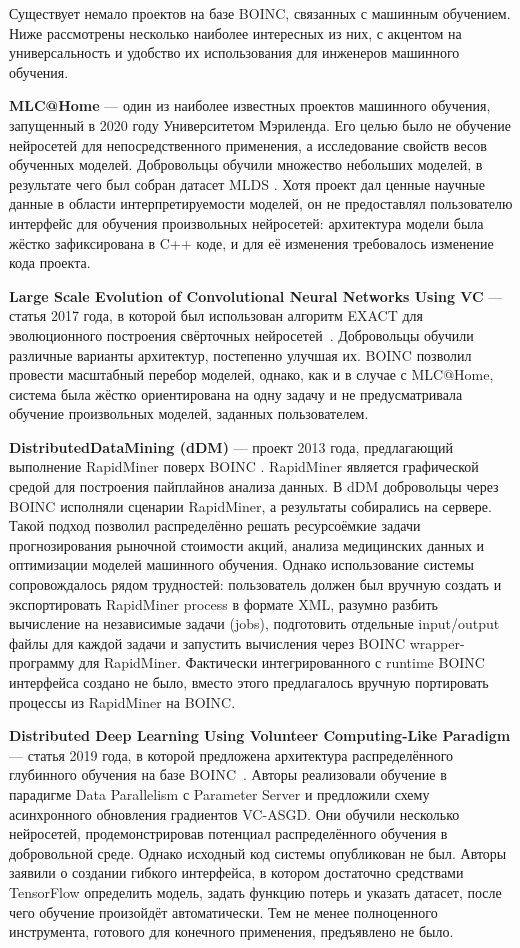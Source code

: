 \documentclass[a4paper,12pt]{extarticle}
\begin{document}
Существует немало проектов на базе BOINC, связанных с машинным обучением. Ниже рассмотрены несколько наиболее интересных из них, с акцентом на универсальность и удобство их использования для инженеров машинного обучения.

\textbf{MLC@Home} — один из наиболее известных проектов машинного обучения, запущенный в 2020 году Университетом Мэриленда. Его целью было не обучение нейросетей для непосредственного применения, а исследование свойств весов обученных моделей. Добровольцы обучили множество небольших моделей, в результате чего был собран датасет MLDS \cite{Clemens2021}. Хотя проект дал ценные научные данные в области интерпретируемости моделей, он не предоставлял пользователю интерфейс для обучения произвольных нейросетей: архитектура модели была жёстко зафиксирована в C++ коде, и для её изменения требовалось изменение кода проекта.

\textbf{Large Scale Evolution of Convolutional Neural Networks Using VC} — статья 2017 года, в которой был использован алгоритм EXACT для эволюционного построения свёрточных нейросетей~\cite{Desell2017}. Добровольцы обучили различные варианты архитектур, постепенно улучшая их. BOINC позволил провести масштабный перебор моделей, однако, как и в случае с MLC@Home, система была жёстко ориентирована на одну задачу и не предусматривала обучение произвольных моделей, заданных пользователем.

\textbf{DistributedDataMining (dDM)} — проект 2013 года, предлагающий выполнение RapidMiner поверх BOINC \cite{Schlitter2013}. RapidMiner является графической средой для построения пайплайнов анализа данных. В dDM добровольцы через BOINC исполняли сценарии \newline RapidMiner, а результаты собирались на сервере. Такой подход позволил распределённо решать ресурсоёмкие задачи прогнозирования рыночной стоимости акций, анализа медицинских данных и оптимизации моделей машинного обучения. Однако использование системы сопровождалось рядом трудностей: пользователь должен был вручную создать и экспортировать RapidMiner process в формате XML, разумно разбить вычисление на независимые задачи (jobs), подготовить отдельные input/output файлы для каждой задачи и запустить вычисления через BOINC wrapper-программу для RapidMiner. Фактически интегрированного с runtime BOINC интерфейса создано не было, вместо этого предлагалось вручную портировать процессы из RapidMiner на BOINC.

\textbf{Distributed Deep Learning Using Volunteer Computing-Like Paradigm} — статья 2019 года, в которой предложена архитектура распределённого глубинного обучения на базе BOINC~\cite{atre2021distributed}. Авторы реализовали обучение в парадигме Data Parallelism с Parameter Server и предложили схему асинхронного обновления градиентов VC-ASGD. Они обучили несколько нейросетей, продемонстрировав потенциал распределённого обучения в добровольной среде. Однако исходный код системы опубликован не был. Авторы заявили о создании гибкого интерфейса, в котором достаточно средствами TensorFlow определить модель, задать функцию потерь и указать датасет, после чего обучение произойдёт автоматически. Тем не менее полноценного инструмента, готового для конечного применения, предъявлено не было.
\end{document}
